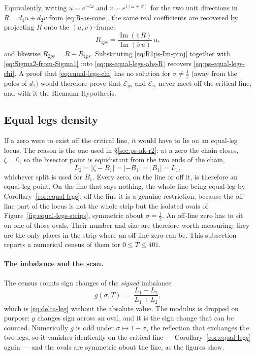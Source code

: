 \documentclass[11pt]{article}
\theoremstyle{definition}
\begin{document}
Equivalently, writing $u=e^{-i\omega}$ and $v=e^{i(\omega+\psi)}$ for the two
unit directions in $R=d_1 u+d_2 v$ from \eqref{eq:R-as-cone}, the same real
coefficients are recovered by projecting $R$ onto the $(u,v)$-frame:
\begin{equation}\label{eq:R1ps-Im-proj}
R_{1ps}
=
\frac{\operatorname{Im}(\overline{v}\,R)}{\operatorname{Im}(\overline{v}\,u)}\,u,
\end{equation}
and likewise $R_{2ps}=R-R_{1ps}$. Substituting \eqref{eq:R1ps-Im-proj} together
with \eqref{eq:Sigma2-from-Sigma1} into \eqref{eq:ps-equal-legs-abs-R} recovers
\eqref{eq:ps-equal-legs-chi}. A proof that
\eqref{eq:equal-legs-chi} has no solution for $\sigma\neq\tfrac12$ (away from
the poles of $d_1$) would therefore prove that $\mathcal{E}_{\mathrm{ps}}$ and
$\mathcal{E}_{\mathrm{rs}}$ never meet off the critical line, and with it the
Riemann Hypothesis.

\subsection{Equal legs density}\label{sec:eqleg-density}

If a zero were to exist off the critical line, it would have to lie on an
equal-leg locus. The reason is the one used in \S\ref{sec:ps-ak-r2}: at a zero
the chain closes, $\zeta=0$, so the bisector point is equidistant from the two
ends of the chain,
\[
L_2=|\zeta-B_1|=|{-B_1}|=|B_1|=L_1 ,
\]
whichever split is used for $B_1$. Every zero, on the line or off it, is
therefore an equal-leg point. On the line that says nothing, the whole line
being equal-leg by Corollary~\ref{cor:equal-legs}; off the line it is a genuine
restriction, because the off-line part of the locus is not the whole strip but
the isolated ovals of Figure~\ref{fig:equal-legs-strips}, symmetric about
$\sigma=\tfrac12$. An off-line zero has to sit on one of those ovals. Their
number and size are therefore worth measuring: they are the only places in the
strip where an off-line zero can be. This subsection reports a numerical census
of them for $0\le T\le401$.

\paragraph{The imbalance and the scan.} The census counts sign changes of the
\emph{signed} imbalance
\begin{equation}\label{eq:g-imbalance}
g(\sigma,T)\;=\;\frac{L_1-L_2}{L_1+L_2},
\end{equation}
which is \eqref{eq:delta-leg} without the absolute value. The modulus is dropped
on purpose: $g$ changes sign across an oval, and it is the sign change that can
be counted. Numerically $g$ is odd under $\sigma\mapsto1-\sigma$, the reflection
that exchanges the two legs, so it vanishes identically on the critical line ---
Corollary~\ref{cor:equal-legs} again --- and the ovals are symmetric about the
line, as the figures show.
\end{document}
